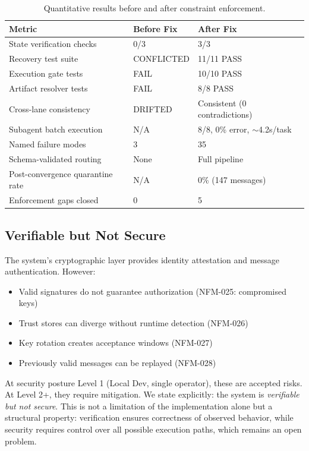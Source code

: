 \documentclass[11pt,letterpaper]{article}
\begin{document}
\begin{table}[h]
\centering
\caption{Quantitative results before and after constraint enforcement.}
\label{tab:results}
\begin{tabular}{lll}
\toprule
\textbf{Metric} & \textbf{Before Fix} & \textbf{After Fix} \\
\midrule
State verification checks & 0/3 & 3/3 \\
Recovery test suite & CONFLICTED & 11/11 PASS \\
Execution gate tests & FAIL & 10/10 PASS \\
Artifact resolver tests & FAIL & 8/8 PASS \\
Cross-lane consistency & DRIFTED & Consistent (0 contradictions) \\
Subagent batch execution & N/A & 8/8, 0\% error, $\sim$4.2s/task \\
Named failure modes & 3 & 35 \\
Schema-validated routing & None & Full pipeline \\
Post-convergence quarantine rate & N/A & 0\% (147 messages) \\
Enforcement gaps closed & 0 & 5 \\
\bottomrule
\end{tabular}
\end{table}

\subsection{Verifiable but Not Secure}

The system's cryptographic layer provides identity attestation and message authentication. However:
\begin{itemize}[nosep]
  \item Valid signatures do not guarantee authorization (NFM-025: compromised keys)
  \item Trust stores can diverge without runtime detection (NFM-026)
  \item Key rotation creates acceptance windows (NFM-027)
  \item Previously valid messages can be replayed (NFM-028)
\end{itemize}

At security posture Level 1 (Local Dev, single operator), these are accepted risks. At Level 2+, they require mitigation. We state explicitly: the system is \textit{verifiable but not secure}. This is not a limitation of the implementation alone but a structural property: verification ensures correctness of observed behavior, while security requires control over all possible execution paths, which remains an open problem.
\end{document}

